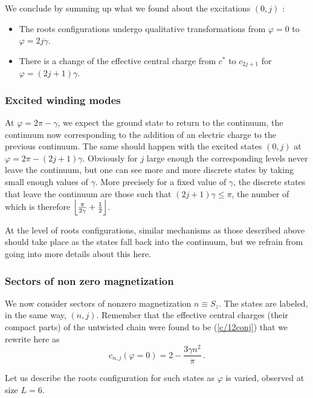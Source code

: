 \documentclass[11pt]{article}
\begin{document}
We conclude by summing up what we found about the excitations $(0,j)$ : 
{\bf
\begin{itemize}
 \item The roots configurations undergo qualitative transformations from $\varphi =0$ to $\varphi = 2 j \gamma$.
 \item There is a change of the effective central charge from $c^{*}$ to $c_{2j+1}$ for $\varphi = (2j+1)\gamma$. 
\end{itemize}
}

\subsubsection{Excited winding modes}

At $\varphi = 2\pi-\gamma$, we expect the ground state to return to the continuum, the continuum now corresponding to the addition of an electric charge to the previous continuum. 
The same should happen with the excited states $(0,j)$ at $\varphi = 2\pi - (2 j + 1)\gamma$. 
Obviously for $j$ large enough the corresponding levels never leave the continuum, but one can see more and more discrete states by taking small enough values of $\gamma$. 
More precisely for a fixed value of $\gamma$, the discrete states that leave the continuum are those such that $(2j+1)\gamma \leq \pi$, the number of which is therefore $\left\lfloor {\pi \over 2\gamma} + {1 \over 2}\right\rfloor$.

At the level of roots configurations, similar mechanisms as those described above should take place as the states fall back into the continuum, but we refrain from going into more details about this here.

\subsubsection{Sectors of non zero magnetization}

We now consider sectors of nonzero magnetization $n \equiv S_z$. The states are labeled, in the same way, $(n,j)$. 
Remember that the effective central charges (their compact parts) of the untwisted chain were found to be (\ref{c/12conj}) that we rewrite here as
\begin{equation}
 c_{n,j} (\varphi = 0) = 2 - \frac{3 \gamma n^2}{\pi} \,.
\end{equation}

Let us describe the roots configuration for such states as $\varphi$ is varied, observed at size $L=6$.
\end{document}
